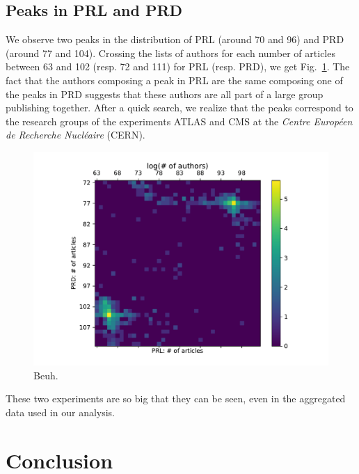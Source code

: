 \documentclass[aps,prl,floatfix,twocolumn]{revtex4-1}
\begin{document}
\subsection{Peaks in PRL and PRD}
We observe two peaks in the distribution of PRL (around 70 and 96) and PRD (around 77 and 104). 
Crossing the lists of authors for each number of articles between 63 and 102 (resp. 72 and 111) for PRL (resp. PRD), we get Fig.~\ref{fig:prl_prd}. 
The fact that the authors composing a peak in PRL are the same composing one of the peaks in PRD suggests that these authors are all part of a large group publishing together. 
After a quick search, we realize that the peaks correspond to the research groups of the experiments ATLAS and CMS at the  \emph{Centre Europ\'een de Recherche Nucl\'eaire} (CERN). 
\begin{figure}
 \centering
 \includegraphics[width=.8\columnwidth]{figures/prl_prd_log.pdf}
 \caption{Beuh.}
 \label{fig:prl_prd}
\end{figure}
These two experiments are so big that they can be seen, even in the aggregated data used in our analysis. 

\section{Conclusion}




\end{document}
